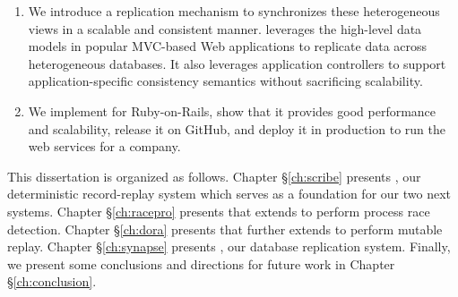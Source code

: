 \begin{enumerate}
\item We introduce a replication mechanism to synchronizes these heterogeneous
views in a scalable and consistent manner. \synapse leverages the high-level
data models in popular MVC-based Web applications to replicate data across
heterogeneous databases. It also leverages application controllers to support
application-specific consistency semantics without sacrificing scalability.

\item We implement \synapse for Ruby-on-Rails, show that it provides
good performance and scalability, release it on GitHub, and deploy it in
production to run the web services for a company.

\end{enumerate}

This dissertation is organized as follows.
Chapter \S\ref{ch:scribe} presents \scribe, our deterministic record-replay
system which serves as a foundation for our two next systems.
Chapter \S\ref{ch:racepro} presents \racepro that extends \scribe to perform
process race detection.
Chapter \S\ref{ch:dora} presents \dora that further extends \scribe to perform
mutable replay.
Chapter \S\ref{ch:synapse} presents \synapse, our database replication system.
Finally, we present some conclusions and directions for future work in Chapter
\S\ref{ch:conclusion}.

